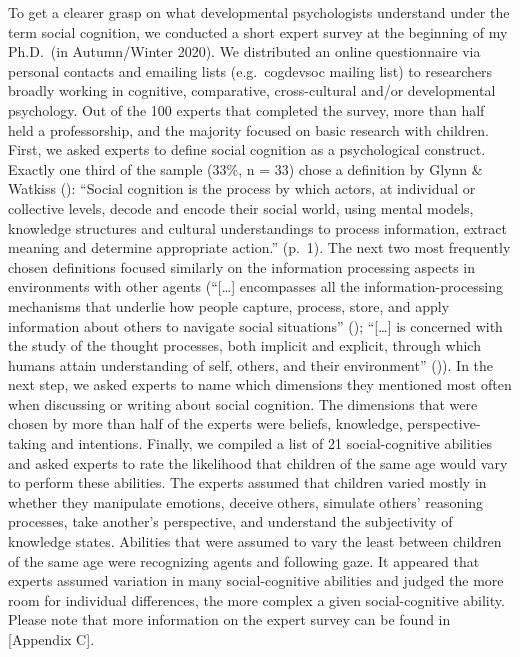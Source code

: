 \documentclass[
]{scrbook}
\begin{document}
To get a clearer grasp on what developmental psychologists understand under the term social cognition, we conducted a short expert survey at the beginning of my Ph.D.~(in Autumn/Winter 2020). We distributed an online questionnaire via personal contacts and emailing lists (e.g.~cogdevsoc mailing list) to researchers broadly working in cognitive, comparative, cross-cultural and/or developmental psychology. Out of the 100 experts that completed the survey, more than half held a professorship, and the majority focused on basic research with children. First, we asked experts to define social cognition as a psychological construct. Exactly one third of the sample (33\%, n = 33) chose a definition by Glynn \& Watkiss (): ``Social cognition is the process by which actors, at individual or collective levels, decode and encode their social world, using mental models, knowledge structures and cultural understandings to process information, extract meaning and determine appropriate action.'' (p.~1). The next two most frequently chosen definitions focused similarly on the information processing aspects in environments with other agents (``{[}\ldots{]} encompasses all the information-processing mechanisms that underlie how people capture, process, store, and apply information about others to navigate social situations'' (); ``{[}\ldots{]} is concerned with the study of the thought processes, both implicit and explicit, through which humans attain understanding of self, others, and their environment'' ()). In the next step, we asked experts to name which dimensions they mentioned most often when discussing or writing about social cognition. The dimensions that were chosen by more than half of the experts were beliefs, knowledge, perspective-taking and intentions. Finally, we compiled a list of 21 social-cognitive abilities and asked experts to rate the likelihood that children of the same age would vary to perform these abilities. The experts assumed that children varied mostly in whether they manipulate emotions, deceive others, simulate others' reasoning processes, take another's perspective, and understand the subjectivity of knowledge states. Abilities that were assumed to vary the least between children of the same age were recognizing agents and following gaze. It appeared that experts assumed variation in many social-cognitive abilities and judged the more room for individual differences, the more complex a given social-cognitive ability. Please note that more information on the expert survey can be found in {[}Appendix C{]}.
\end{document}
